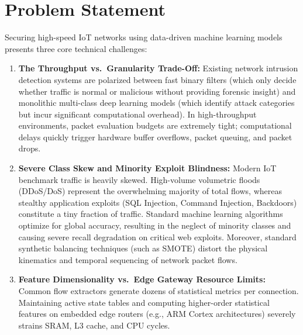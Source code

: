 \documentclass[12pt,a4paper]{report}
\begin{document}
\section{Problem Statement}
Securing high-speed IoT networks using data-driven machine learning models presents three core technical challenges:
\begin{enumerate}
    \item \textbf{The Throughput vs.\ Granularity Trade-Off:} Existing network intrusion detection systems are polarized between fast binary filters (which only decide whether traffic is normal or malicious without providing forensic insight) and monolithic multi-class deep learning models (which identify attack categories but incur significant computational overhead). In high-throughput environments, packet evaluation budgets are extremely tight; computational delays quickly trigger hardware buffer overflows, packet queuing, and packet drops.
    \item \textbf{Severe Class Skew and Minority Exploit Blindness:} Modern IoT benchmark traffic is heavily skewed. High-volume volumetric floods (DDoS/DoS) represent the overwhelming majority of total flows, whereas stealthy application exploits (SQL Injection, Command Injection, Backdoors) constitute a tiny fraction of traffic. Standard machine learning algorithms optimize for global accuracy, resulting in the neglect of minority classes and causing severe recall degradation on critical web exploits. Moreover, standard synthetic balancing techniques (such as SMOTE) distort the physical kinematics and temporal sequencing of network packet flows.
    \item \textbf{Feature Dimensionality vs.\ Edge Gateway Resource Limits:} Common flow extractors generate dozens of statistical metrics per connection. Maintaining active state tables and computing higher-order statistical features on embedded edge routers (e.g., ARM Cortex architectures) severely strains SRAM, L3 cache, and CPU cycles.
\end{enumerate}
\end{document}
